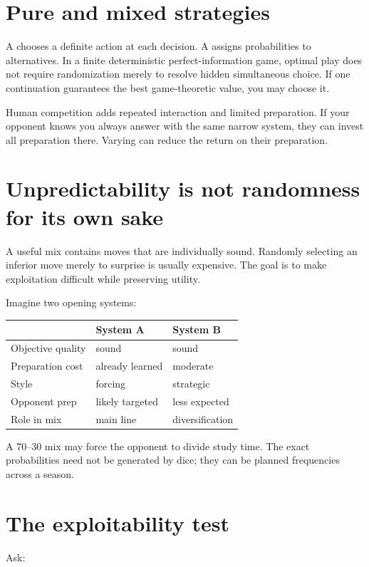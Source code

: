 \section{Pure and mixed strategies}
A  chooses a definite action at each decision. A  assigns probabilities to alternatives. In a finite deterministic perfect-information game, optimal play does not require randomization merely to resolve hidden simultaneous choice. If one continuation guarantees the best game-theoretic value, you may choose it.

Human competition adds repeated interaction and limited preparation. If your opponent knows you always answer  with the same narrow system, they can invest all preparation there. Varying can reduce the return on their preparation.

\section{Unpredictability is not randomness for its own sake}
A useful mix contains moves that are individually sound. Randomly selecting an inferior move merely to surprise is usually expensive. The goal is to make exploitation difficult while preserving utility.

Imagine two opening systems:

\begin{center}
\begin{tabularx}{.92\textwidth}{p{}YY}
\toprule
& \textbf{System A} & \textbf{System B}\\
\midrule
Objective quality & sound & sound\\
Preparation cost & already learned & moderate\\
Style & forcing & strategic\\
Opponent prep & likely targeted & less expected\\
Role in mix & main line & diversification\\
\bottomrule
\end{tabularx}
\end{center}

A 70--30 mix may force the opponent to divide study time. The exact probabilities need not be generated by dice; they can be planned frequencies across a season.

\section{The exploitability test}
Ask:

